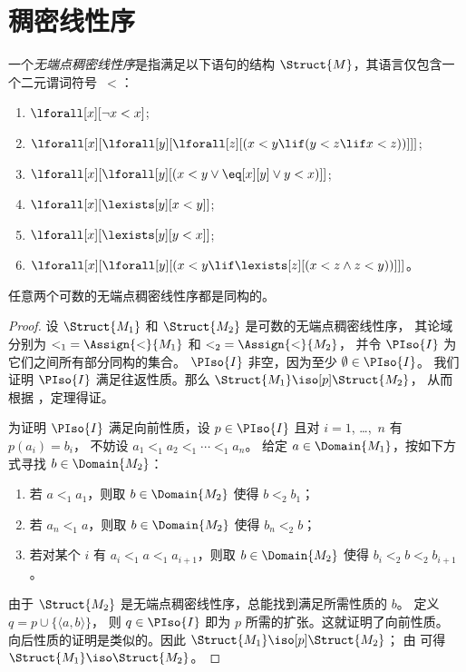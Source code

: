 \documentclass[../../../include/open-logic-section]{subfiles}
\begin{document}
\section{稠密线性序}

\begin{defn}
  一个\emph{无端点稠密线性序}是指满足以下语句的结构
  $\Struct{M}$，其语言仅包含一个二元谓词符号~$<$：
  \begin{enumerate}
  \item $\lforall[x][\lnot x < x]$;
  \item $\lforall[x][\lforall[y][\lforall[z][(x < y \lif (y < z \lif x
    <z ))]]]$;
  \item $\lforall[x][\lforall[y][(x< y \lor \eq[x][y] \lor y < x)]]$;
  \item $\lforall[x][\lexists[y][x < y]]$;
  \item $\lforall[x][\lexists[y][y < x]]$;
  \item $\lforall[x][\lforall[y][(x < y \lif \lexists[z][(x < z \land
        z < y))]]]$。
 \end{enumerate}
\end{defn}

\begin{thm}
  任意两个可数的无端点稠密线性序都是同构的。
\end{thm}

\begin{proof}
  设 $\Struct{M_1}$ 和 $\Struct{M_2}$ 是可数的无端点稠密线性序，
  其论域分别为 ${<_1} = \Assign{<}{M_1}$ 和 ${<_2} =
  \Assign{<}{M_2}$，
  并令 $\PIso{I}$ 为它们之间所有部分同构的集合。
  $\PIso{I}$ 非空，因为至少 $\emptyset \in \PIso{I}$。
  我们证明 $\PIso{I}$ 满足往返性质。那么 $\Struct{M_1} \iso[p] \Struct{M_2}$，
  从而根据 ，定理得证。

  为证明 $\PIso{I}$ 满足向前性质，设 $p \in \PIso{I}$ 且对 $i = 1$,
  \dots,~$n$ 有 $p(a_i) = b_i$，
  不妨设 $a_1 <_1 a_2 <_1 \cdots <_1
  a_n$。
  给定 $a \in \Domain{M_1}$，按如下方式寻找 $b \in \Domain{M_2}$：
  \begin{enumerate}
  \item 若 $a <_1 a_1$，则取 $b \in \Domain{M_2}$ 使得 $b <_2 b_1$；
  \item 若 $a_n <_1 a$，则取 $b \in \Domain{M_2}$ 使得 $b_n <_2 b$；
  \item 若对某个 $i$ 有 $a_i <_1 a <_1 a_{i+1}$，则取 $b \in \Domain{M_2}$ 使得 $b_i <_2 b <_2 b_{i+1}$。
  \end{enumerate}
  由于 $\Struct{M_2}$ 是无端点稠密线性序，总能找到满足所需性质的 $b$。
  定义 $q = p \cup \{ \langle a, b \rangle \}$，
  则 $q \in \PIso{I}$ 即为 $p$ 所需的扩张。这就证明了向前性质。
  向后性质的证明是类似的。因此 $\Struct{M_1} \iso[p]
  \Struct{M_2}$；
  由  可得 $\Struct{M_1} \iso
  \Struct{M_2}$。
\end{proof}
\end{document}
